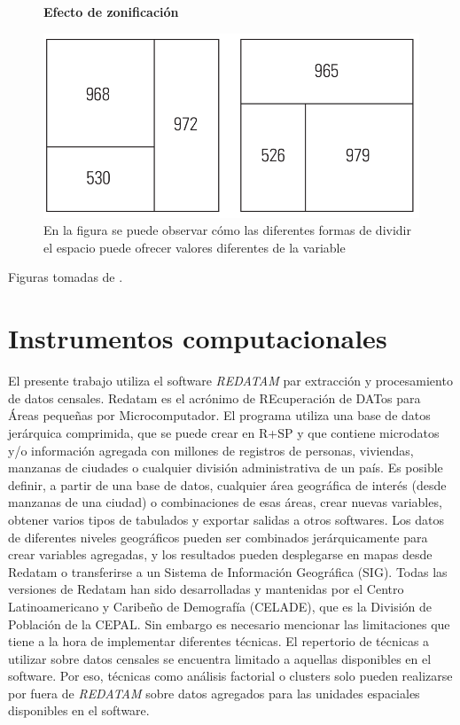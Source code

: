 \begin{figure}[htb]
	\centering
	\textbf{Efecto de zonificación}\par\medskip
	\includegraphics[scale = 0.5]{../img/capitulo3/zonificacion.png}
	\caption{En la figura se puede observar cómo las diferentes formas de dividir el espacio puede ofrecer valores diferentes de la variable}
\end{figure}
	
	Figuras tomadas de \cite{loyd}.
	
	
	\section{Instrumentos computacionales}
	
El presente trabajo utiliza el software \textit{REDATAM} par extracción y procesamiento de datos censales. Redatam es el acrónimo de REcuperación de DATos para Áreas pequeñas por Microcomputador.  El programa utiliza una base de datos jerárquica comprimida, que se puede crear en R+SP y que contiene microdatos y/o información agregada con millones de registros de personas, viviendas, manzanas de ciudades o cualquier división administrativa de un país. Es posible definir, a partir de una base de datos, cualquier área geográfica de interés (desde manzanas de una ciudad) o combinaciones de esas áreas, crear nuevas variables, obtener varios tipos de tabulados y exportar salidas a otros softwares. Los datos de diferentes niveles geográficos pueden ser combinados jerárquicamente para crear variables agregadas, y los resultados pueden desplegarse en mapas desde Redatam o transferirse a un Sistema de Información Geográfica (SIG). Todas las versiones de Redatam han sido desarrolladas y mantenidas por el Centro Latinoamericano y Caribeño de Demografía (CELADE), que es la División de Población de la CEPAL. Sin embargo es necesario mencionar las limitaciones que tiene a la hora de implementar diferentes técnicas. El repertorio de técnicas a utilizar sobre datos censales se encuentra limitado a aquellas disponibles en el software. Por eso, técnicas como análisis factorial o clusters solo pueden realizarse por fuera de \textit{REDATAM} sobre datos agregados para las unidades espaciales disponibles en el software. 


